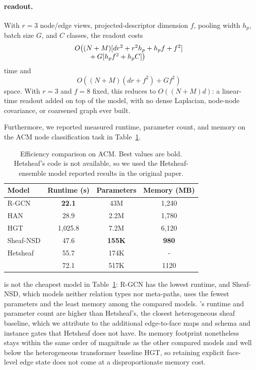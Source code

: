 \paragraph{\sheafconvpool{} readout.} With $r=3$ node/edge views, projected-descriptor
dimension $f$, pooling width $h_p$, batch size $G$, and $C$ classes, the readout costs
\[
\begin{array}{@{}l@{}}
O\bigl((N+M)[dr^2+r^2h_p+h_pf+f^2] \\
\qquad{}+G[h_pf^2+h_pC]\bigr)
\end{array}
\]
time and
\[
O\!\left((N+M)(dr+f^2)+Gf^2\right)
\]
space. With $r=3$ and $f=8$ fixed, this reduces to $O((N+M)d)$: a linear-time readout
added on top of the model, with no dense Laplacian, node-node covariance, or coarsened graph
ever built.

Furthermore, we reported measured runtime, parameter count, and memory on the ACM node
classification task in Table~\ref{tab:efficiency}.

\begin{table}[H]
  \centering
  \caption{Efficiency comparison on ACM. Best values are bold. Hetsheaf's code is not available, so we used the Hetsheaf-ensemble model reported results in the original paper.}
  \label{tab:efficiency}
  \small
  \begin{tabular}{lccc}
    \toprule
    \textbf{Model} & Runtime (s) & Parameters & Memory (MB) \\
    \midrule
    R-GCN & \textbf{22.1} & 43M & 1{,}240 \\
    HAN & 28.9 & 2.2M & 1{,}780 \\
    HGT & 1{,}025.8 & 7.2M & 6{,}120 \\
    Sheaf-NSD & 47.6 & \textbf{155K} & \textbf{980} \\
    Hetsheaf & 55.7 & 174K & - \\
    \midrule
    \textbf{\method{}} & 72.1 & 517K & 1120 \\
    \bottomrule
  \end{tabular}
\end{table}

\method{} is not the cheapest model in Table~\ref{tab:efficiency}: R-GCN has the lowest runtime,
and Sheaf-NSD, which models neither relation types nor meta-paths, uses the fewest parameters and
the least memory among the compared models. \method{}'s runtime and parameter count are higher
than Hetsheaf's, the closest heterogeneous sheaf baseline, which we attribute to the additional
edge-to-face maps and \ampss{} schema and instance gates that Hetsheaf does not have. Its memory
footprint nonetheless stays within the same order of magnitude as the other compared models and
well below the heterogeneous transformer baseline HGT, so retaining explicit face-level edge state
does not come at a disproportionate memory cost.





